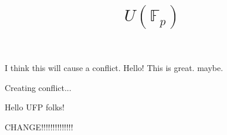 \documentclass{amsart}
\begin{document}
I think this will cause a conflict. 
 Hello! This is great. maybe. 


    \title{$U(\mathbb{F}_p)$}

Creating conflict...

    \maketitle

 Hello UFP folks!

CHANGE!!!!!!!!!!!!!!
\end{document}
